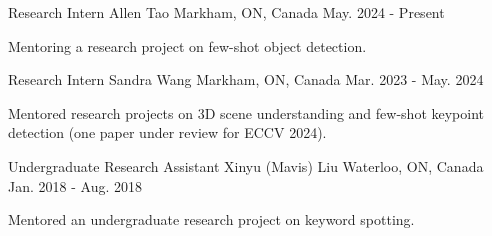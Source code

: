 \begin{cventries}
\cventry
{Research Intern} %
{Allen Tao} %
{Markham, ON, Canada} %
{May. 2024 - Present} %
{ %
\begin{cvitems}
\item {Mentoring a research project on few-shot object detection.}
\end{cvitems}
}
\cventry
{Research Intern} %
{Sandra Wang} %
{Markham, ON, Canada} %
{Mar. 2023 - May. 2024} %
{ %
\begin{cvitems}
\item {Mentored research projects on 3D scene understanding and few-shot keypoint detection (one paper under review for ECCV 2024).}
\end{cvitems}
}
\cventry
{Undergraduate Research Assistant} %
{Xinyu (Mavis) Liu} %
{Waterloo, ON, Canada} %
{Jan. 2018 - Aug. 2018} %
{ %
\begin{cvitems}
\item {Mentored an undergraduate research project on keyword spotting.}
\end{cvitems}
}
\end{cventries}
